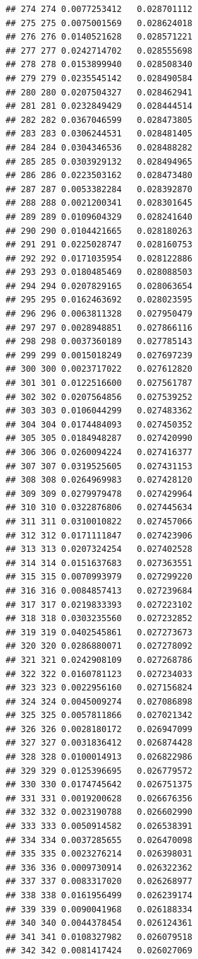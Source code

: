 \documentclass[
]{book}
\begin{document}
\begin{verbatim}
## 274 274 0.0077253412   0.028701112
## 275 275 0.0075001569   0.028624018
## 276 276 0.0140521628   0.028571221
## 277 277 0.0242714702   0.028555698
## 278 278 0.0153899940   0.028508340
## 279 279 0.0235545142   0.028490584
## 280 280 0.0207504327   0.028462941
## 281 281 0.0232849429   0.028444514
## 282 282 0.0367046599   0.028473805
## 283 283 0.0306244531   0.028481405
## 284 284 0.0304346536   0.028488282
## 285 285 0.0303929132   0.028494965
## 286 286 0.0223503162   0.028473480
## 287 287 0.0053382284   0.028392870
## 288 288 0.0021200341   0.028301645
## 289 289 0.0109604329   0.028241640
## 290 290 0.0104421665   0.028180263
## 291 291 0.0225028747   0.028160753
## 292 292 0.0171035954   0.028122886
## 293 293 0.0180485469   0.028088503
## 294 294 0.0207829165   0.028063654
## 295 295 0.0162463692   0.028023595
## 296 296 0.0063811328   0.027950479
## 297 297 0.0028948851   0.027866116
## 298 298 0.0037360189   0.027785143
## 299 299 0.0015018249   0.027697239
## 300 300 0.0023717022   0.027612820
## 301 301 0.0122516600   0.027561787
## 302 302 0.0207564856   0.027539252
## 303 303 0.0106044299   0.027483362
## 304 304 0.0174484093   0.027450352
## 305 305 0.0184948287   0.027420990
## 306 306 0.0260094224   0.027416377
## 307 307 0.0319525605   0.027431153
## 308 308 0.0264969983   0.027428120
## 309 309 0.0279979478   0.027429964
## 310 310 0.0322876806   0.027445634
## 311 311 0.0310010822   0.027457066
## 312 312 0.0171111847   0.027423906
## 313 313 0.0207324254   0.027402528
## 314 314 0.0151637683   0.027363551
## 315 315 0.0070993979   0.027299220
## 316 316 0.0084857413   0.027239684
## 317 317 0.0219833393   0.027223102
## 318 318 0.0303235560   0.027232852
## 319 319 0.0402545861   0.027273673
## 320 320 0.0286880071   0.027278092
## 321 321 0.0242908109   0.027268786
## 322 322 0.0160781123   0.027234033
## 323 323 0.0022956160   0.027156824
## 324 324 0.0045009274   0.027086898
## 325 325 0.0057811866   0.027021342
## 326 326 0.0028180172   0.026947099
## 327 327 0.0031836412   0.026874428
## 328 328 0.0100014913   0.026822986
## 329 329 0.0125396695   0.026779572
## 330 330 0.0174745642   0.026751375
## 331 331 0.0019200628   0.026676356
## 332 332 0.0023190788   0.026602990
## 333 333 0.0050914582   0.026538391
## 334 334 0.0037285655   0.026470098
## 335 335 0.0023276214   0.026398031
## 336 336 0.0009730914   0.026322362
## 337 337 0.0083317020   0.026268977
## 338 338 0.0161956499   0.026239174
## 339 339 0.0090041968   0.026188334
## 340 340 0.0044378454   0.026124361
## 341 341 0.0108327982   0.026079518
## 342 342 0.0081417424   0.026027069

\end{verbatim}
\end{document}
